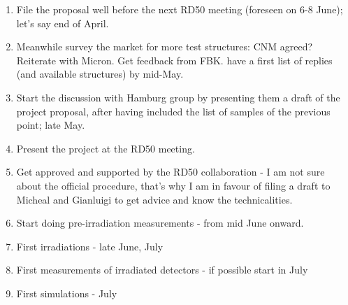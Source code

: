 \documentclass[dvips,12pt]{article}
\begin{document}
\begin{enumerate}[1)]
\item File the proposal well before the next RD50 meeting (foreseen on 6-8 June); let's say end of 
April.
\item Meanwhile survey the market for more test structures: CNM agreed? Reiterate with Micron. Get 
feedback from FBK. 
have a first list of replies (and available structures) by mid-May.
\item Start the discussion with Hamburg group by presenting them a draft of the project proposal, 
after having included the list of samples of the previous point; late May.
\item Present the project at the RD50 meeting.
\item Get approved and supported by the RD50 collaboration - I am not sure about the official 
procedure, that's why I am in favour of filing a draft to Micheal and Gianluigi to get advice and know 
the technicalities.
\item Start doing pre-irradiation measurements - from mid June onward.
\item First irradiations - late June, July
\item First measurements of irradiated detectors - if possible start in July
\item First simulations - July
\end{enumerate}

\newpage



\end{document}
